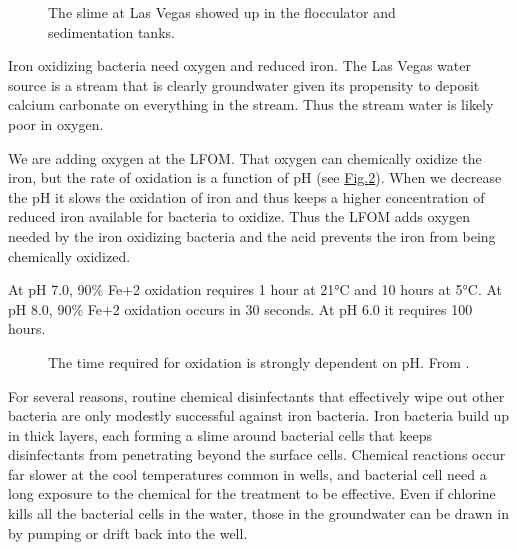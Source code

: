 \documentclass[letterpaper,10pt,english]{sphinxmanual}
\let\sphinxpxdimen\pdfpxdimen\else\newdimen\sphinxpxdimen
\begin{document}
\begin{figure}[htbp]
\centering
\capstart

\noindent\sphinxincludegraphics[width=400\sphinxpxdimen]{{Las_Vegas_Slime}.jpg}
\caption{The slime at Las Vegas showed up in the flocculator and sedimentation tanks.}\label{\detokenize{Troubleshooting/Troubleshooting:id2}}\label{\detokenize{Troubleshooting/Troubleshooting:figure-las-vegas-slime}}\end{figure}

Iron oxidizing bacteria need oxygen and reduced iron. The Las Vegas water source is a stream that is clearly groundwater given its propensity to deposit calcium carbonate on everything in the stream. Thus the stream water is likely poor in oxygen.

We are adding oxygen at the LFOM. That oxygen can chemically oxidize the iron, but the rate of oxidation is a function of pH (see \hyperref[\detokenize{Troubleshooting/Troubleshooting:figure-oxygenation-vs-time}]{Fig.\@ \ref{\detokenize{Troubleshooting/Troubleshooting:figure-oxygenation-vs-time}}}). When we decrease the pH it slows the oxidation of iron and thus keeps a higher concentration of reduced iron available for bacteria to oxidize. Thus the LFOM adds oxygen needed by the iron oxidizing bacteria and the acid prevents the iron from being chemically oxidized.

At pH 7.0, 90\% Fe+2 oxidation requires 1 hour at 21°C and 10 hours at 5°C.
At pH 8.0, 90\% Fe+2 oxidation occurs in 30 seconds.
At pH 6.0 it requires 100 hours.

\begin{figure}[htbp]
\centering
\capstart

\noindent\sphinxincludegraphics[width=400\sphinxpxdimen]{{Oxygenation_vs_time}.png}
\caption{The time required for oxidation is strongly dependent on pH. From .}\label{\detokenize{Troubleshooting/Troubleshooting:id3}}\label{\detokenize{Troubleshooting/Troubleshooting:figure-oxygenation-vs-time}}\end{figure}

For several reasons, routine chemical disinfectants that effectively wipe out other bacteria are only modestly successful against iron bacteria. Iron bacteria build up in thick layers, each forming a slime around bacterial cells that keeps disinfectants from penetrating beyond the surface cells. Chemical reactions occur far slower at the cool temperatures common in wells, and bacterial cell need a long exposure to the chemical for the treatment to be effective. Even if chlorine kills all the bacterial cells in the water, those in the groundwater can be drawn in by pumping or drift back into the well. 
\end{document}
